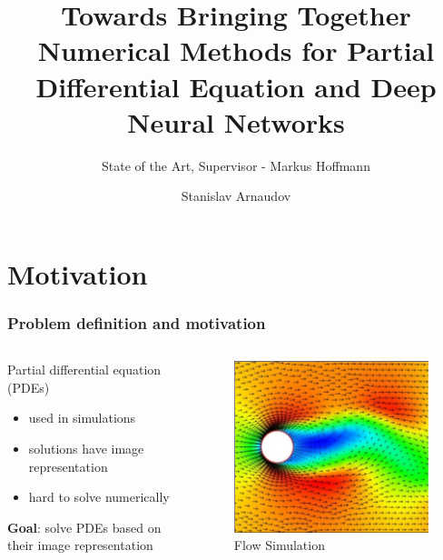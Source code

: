 \documentclass[18pt]{beamer}
\title[State of the Art]{Towards Bringing Together Numerical Methods for Partial Differential Equation and Deep Neural Networks}
\subtitle{State of the Art, Supervisor - Markus Hoffmann}
\author{Stanislav Arnaudov}
\institute{Chair for Computer Architecture and Parallel Processing}
\begin{document}
 

\begin{frame}
 \titlepage
\end{frame}


\section{Motivation}
\begin{frame}

  \frametitle{Problem definition and motivation}

  \begin{columns}

    \begin{column}{0.5\textwidth}
      Partial differential equation (PDEs)
      \begin{itemize}
      \item used in simulations
      \item solutions have image representation
      \item hard to solve numerically
      \end{itemize}
      \vspace{0.25cm}
      \textbf{Goal}: solve PDEs based on their image representation 
      \vspace{-0.5cm}
    \end{column}

    \begin{column}{0.5\textwidth}
      \begin{center}
        \begin{figure}[htb]
          \includegraphics[scale=0.35]{images/pde}
          \caption{Flow Simulation\footnotemark}
        \end{figure}
      \end{center}
    \end{column}

  \end{columns}
  
\end{frame}
\end{document}
